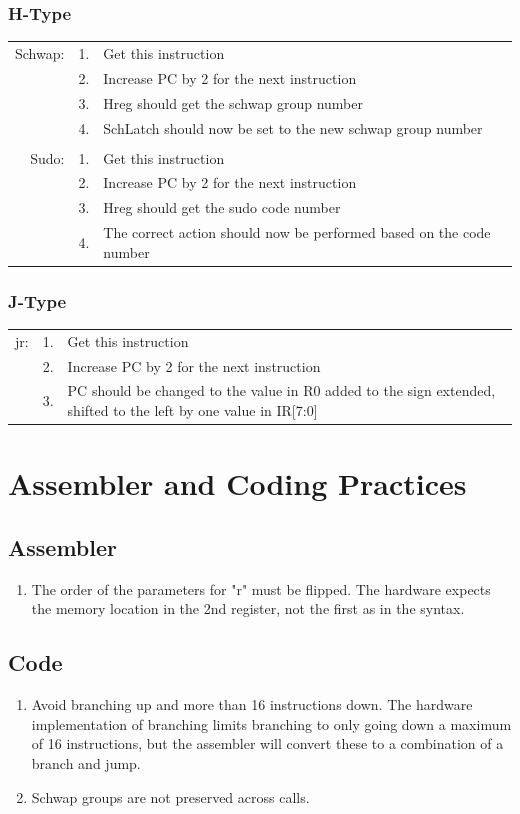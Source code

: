\documentclass{article}
\begin{document}
		\subsubsection{H-Type}
			\begin{tabular}{ r  r  p{12cm} }
				Schwap: & 1. & Get this instruction\\
				        & 2. & Increase PC by 2 for the next instruction\\
				        & 3. & Hreg should get the schwap group number\\
				        & 4. & SchLatch should now be set to the new schwap group number\\
				        &    & \\
				Sudo:   & 1. & Get this instruction\\
				        & 2. & Increase PC by 2 for the next instruction\\
				        & 3. & Hreg should get the sudo code number\\
				        & 4. & The correct action should now be performed based on the code number\\
			\end{tabular}
		\subsubsection{J-Type}
			\begin{tabular}{ r  r  p{12cm} }
				jr: & 1. & Get this instruction\\
				    & 2. & Increase PC by 2 for the next instruction\\
				    & 3. & PC should be changed to the value in R0 added to the sign extended, shifted to the left by one value in IR[7:0]\\
			\end{tabular}
\section{Assembler and Coding Practices}
	\subsection{Assembler}
		\begin{enumerate}
			\item The order of the parameters for "r" must be flipped.  The hardware expects the memory location in the 2nd register, not the first as in the syntax.
		\end{enumerate}
	\subsection{Code}
		\begin{enumerate}
			\item Avoid branching up and more than 16 instructions down.  The hardware implementation of branching limits branching to only going down a maximum of 16 instructions, but the assembler will convert these to a combination of a branch and jump.
			\item Schwap groups are not preserved across calls.
		\end{enumerate}
\end{document}
